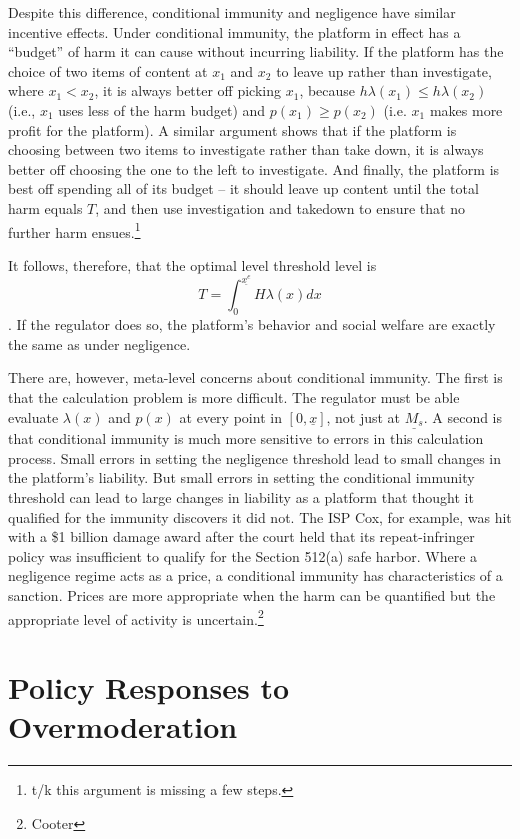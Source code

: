 Despite this difference, conditional immunity and negligence have similar incentive effects. Under conditional immunity, the platform in effect has a ``budget'' of harm it can cause without incurring liability. If the platform has the choice of two items of content at $x_1$ and $x_2$ to leave up rather than investigate, where $x_1 < x_2$, it is always better off picking $x_1$, because $h\lambda(x_1) \le h\lambda(x_2)$ (i.e., $x_1$ uses less of the harm budget) and $p(x_1) \ge p(x_2)$ (i.e. $x_1$ makes more profit for the platform). A similar argument shows that if the platform is choosing between two items to investigate rather than take down, it is always better off choosing the one to the left to investigate. And finally, the platform is best off spending all of its budget -- it should leave up content until the total harm equals $T$, and then use investigation and takedown to ensure that no further harm ensues.\footnote{t/k this argument is missing a few steps.}

It follows, therefore, that the optimal level threshold level is \begin{equation*}T = \int_0^{\underline{x^e}} H\lambda(x) dx\end{equation*}. If the regulator does so, the platform's behavior and social welfare are exactly the same as under negligence.

There are, however, meta-level concerns about conditional immunity. The first is that the calculation problem is more difficult. The regulator must be able evaluate $\lambda(x)$ and $p(x)$ at every point in $[0, \underline{x}]$, not just at $\underline{M_s}$. A second is that conditional immunity is much more sensitive to errors in this calculation process. Small errors in setting the negligence threshold lead to small changes in the platform's liability. But small errors in setting the conditional immunity threshold can lead to large changes in liability as a platform that thought it qualified for the immunity discovers it did not. The ISP Cox, for example, was hit with a \$1 billion damage award after the court held that its repeat-infringer policy was insufficient to qualify for the Section 512(a) safe harbor. Where a negligence regime acts as a price, a conditional immunity has characteristics of a sanction. Prices are more appropriate when the harm can be quantified but the appropriate level of activity is uncertain.\footnote{Cooter}


\section{Policy Responses to Overmoderation}
\label{sec:overmoderation}

